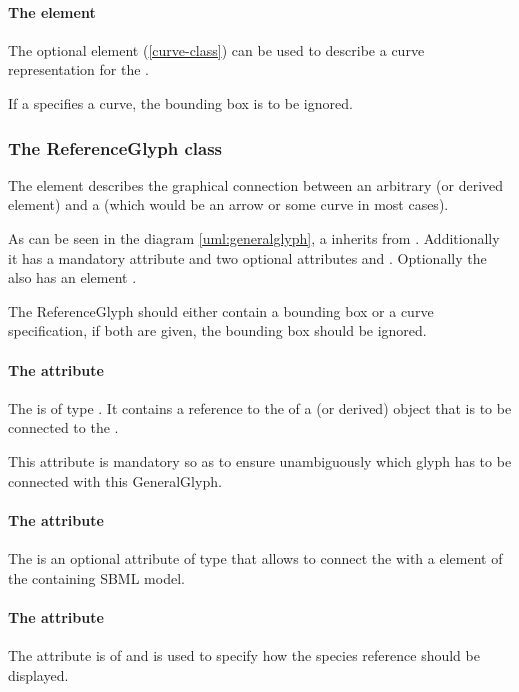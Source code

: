 \paragraph {The  element}
The optional \Curve element (\ref{curve-class}) can be used to describe 
a curve representation for the \GeneralGlyph. 

If a \GeneralGlyph specifies a curve, the bounding box is to be ignored. 

\subsubsection{The ReferenceGlyph class}
\label{referenceglyph-class}
The  element describes the graphical connection 
between an arbitrary \GraphicalObject (or derived element) and a 
\GeneralGlyph (which would be an arrow or some curve in most cases). 

As can be seen in the diagram \ref{uml:generalglyph}, a \ReferenceGlyph 
inherits from \GraphicalObject. Additionally it has a mandatory 
attribute  and two optional attributes  
and . Optionally the \ReferenceGlyph also has an element 
. 

The ReferenceGlyph should either contain a bounding box or a curve 
specification, if both are given, the bounding box should be ignored. 

\paragraph{The  attribute}
The  is of type . It contains a reference 
to the  of a \GraphicalObject (or derived) object that is to 
be connected to the \GeneralGlyph. 

This attribute is mandatory so as to ensure unambiguously which glyph has to be 
connected with this GeneralGlyph. 


\paragraph{The  attribute}
The  is an optional attribute of type  
that allows to connect the \ReferenceGlyph with a element of the 
containing SBML model. 

\paragraph{The  attribute}
The  attribute is of  and is used to 
specify how the species reference should be displayed. 

